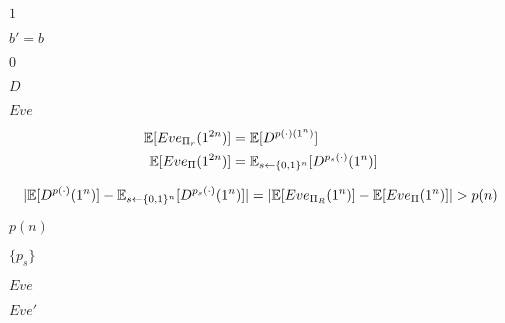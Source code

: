 \documentclass[10pt]{book}
\begin{document}
\begin{mdSnippets}
\begin{mdInlineSnippet}[c4ca4238a0b923820dcc509a6f75849b]%
$1$\end{mdInlineSnippet}%
\begin{mdInlineSnippet}[8ecedbf9a59024f22c6305b014c57828]%
$b' = b$\end{mdInlineSnippet}%
\begin{mdInlineSnippet}%
$0$\end{mdInlineSnippet}%
\begin{mdInlineSnippet}[f623e75af30e62bbd73d6df5b50bb7b5]%
$D$\end{mdInlineSnippet}%
\begin{mdInlineSnippet}%
$Eve$\end{mdInlineSnippet}%
\begin{mdDisplaySnippet}[fcdc786cf0502bd7697f036c9795f799]%
\[%
\begin{aligned}
\E[Eve_{\Pi_r}(1^{2n})] &= \E[D^{p(\cdot)(1^n)}] \\
\E[Eve_{\Pi}(1^{2n})] &= \E_{s \gets \zo^n} [D^{p_s(\cdot)}(1^n)]
\end{aligned}
\]%
\end{mdDisplaySnippet}%
\begin{mdDisplaySnippet}[4aa2ff5f6258ea3efebd3d4cd4668be8]%
\[%
|\E[D^{p(\cdot)}(1^n)] -  \E_{s \gets \zo^n}[D^{p_s(\cdot)}(1^n)] | = |\E[Eve_{\Pi_R}(1^n)] - \E[Eve_{\Pi}(1^n)] | > p(n)
\]%
\end{mdDisplaySnippet}%
\begin{mdInlineSnippet}%
$p(n)$\end{mdInlineSnippet}%
\begin{mdInlineSnippet}[b22b3bfa7e9ed9ef2720c4937426f3ef]%
$\{p_s\}$\end{mdInlineSnippet}%
\begin{mdInlineSnippet}%
$Eve$\end{mdInlineSnippet}%
\begin{mdInlineSnippet}[0c3570ae86ed9d695d5d1d469a0b8bfa]%
$Eve'$\end{mdInlineSnippet}%

\end{mdSnippets}
\end{document}
